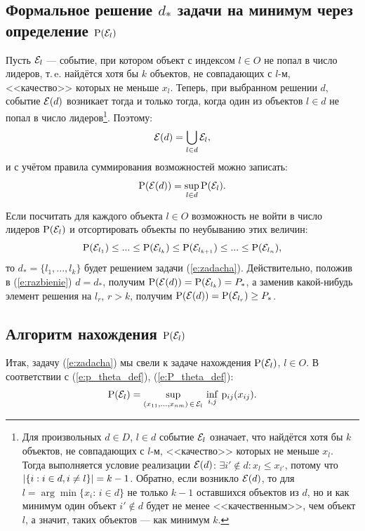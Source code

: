 \subsection{Формальное решение $d_*$ задачи на минимум  через определение ${\mathrm{P}}(\mathcal{E}_l)$}

Пусть $\mathcal{E}_l$ --- событие, при котором объект с индексом $l \in O$ не попал в число лидеров, т.\,e. найдётся хотя бы $k$ объектов, не совпадающих с $l$-м, <<качество>> которых не меньше $x_l$. Теперь, при выбранном решении $d$, событие $\mathcal{E}(d)$ возникает тогда и только тогда, когда один из объектов $l \in d$ не попал в число лидеров\footnote{Для произвольных $d \in D$, $l \in d$ событие $\mathcal{E}_l$ означает, что найдётся хотя бы $k$ объектов, не совпадающих с $l$-м, <<качество>> которых не меньше $x_l$. Тогда выполняется условие реализации $\mathcal{E}(d)$: $\exists i' \notin d: x_l \leq x_{i'}$, потому что $\left| \{i: i \in d, i \neq l\} \right| = k-1$. Обратно, если возникло $\mathcal{E}(d)$, то для $l = \arg\min \{x_i:\,i \in d\}$ не только $k-1$ оставшихся объектов из $d$, но и как минимум один объект $i' \notin d$  будет не менее <<качественным>>, чем объект $l$, а значит, таких объектов --- как минимум $k$.}. Поэтому: 
\begin{equation*}
  \mathcal{E}(d) = \bigcup_{l \in d} \mathcal{E}_l,
\end{equation*}
и с учётом правила суммирования возможностей можно записать:
\begin{equation}
  \label{e:razbienie}
  {\mathrm{P}}(\mathcal{E}(d)) = \sup_{l \in d} {\mathrm{P}}(\mathcal{E}_l).
\end{equation}

Если посчитать для каждого объекта $l \in O$ возможность не войти в число лидеров ${\mathrm{P}}(\mathcal{E}_l)$ и отсортировать объекты по неубыванию этих величин:
\begin{equation}
  \label{e:left_order}
  {\mathrm{P}}(\mathcal{E}_{l_1}) \leq ... \leq {\mathrm{P}}(\mathcal{E}_{l_k}) \leq {\mathrm{P}}(\mathcal{E}_{l_{k+1}}) \leq ... \leq {\mathrm{P}}(\mathcal{E}_{l_n}), 
\end{equation}
то $d_* = \{l_1, ...,  l_k\}$ будет решением задачи (\ref{e:zadacha}). Действительно, положив в (\ref{e:razbienie}) $d = d_*$, получим ${\mathrm{P}}(\mathcal{E}(d)) = {\mathrm{P}}(\mathcal{E}_{l_k}) = P_*$, а заменив какой-нибудь элемент  решения на $l_r$, $r > k$, получим ${\mathrm{P}}(\mathcal{E}(d)) = {\mathrm{P}}(\mathcal{E}_{l_r}) \geq P_*$. 

\subsection{Алгоритм нахождения ${\mathrm{P}}(\mathcal{E}_l)$}
 Итак, задачу (\ref{e:zadacha}) мы свели к задаче нахождения ${\mathrm{P}}(\mathcal{E}_l)$, $l \in O$. В соответствии с (\ref{e:p_theta_def}), (\ref{e:P_theta_def}):
\begin{equation}
  \label{e:pl_main}
  {\mathrm{P}}(\mathcal{E}_l) = \sup_{(x_{11}, ..., x_{nm})\,\in\,\mathcal{E}_l} \, \inf_{i, j}\,{\mathrm{p}}_{ij}(x_{ij}). 
\end{equation}

